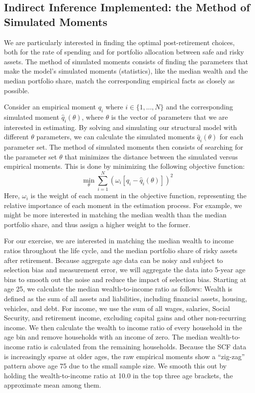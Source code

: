 \documentclass{article}
\begin{document}
\subsection{Indirect Inference Implemented: the Method of Simulated Moments}

We are particularly interested in finding the optimal post-retirement choices, both for the rate of spending and for portfolio allocation between safe and risky assets.
The method of simulated moments consists of finding the parameters that make the model's simulated moments (statistics), like the median wealth and the median portfolio share, match the corresponding empirical facts as closely as possible.

Consider an empirical moment $q_i$ where $i \in \{1,...,N\}$ and the corresponding simulated moment $\hat{q}_i(\theta)$, where $\theta$ is the vector of parameters that we are interested in estimating.
By solving and simulating our structural model with different $\theta$ parameters, we can calculate the simulated moments $\hat{q}_i(\theta)$ for each parameter set.
The method of simulated moments then consists of searching for the parameter set $\theta$ that minimizes the distance between the simulated versus empirical moments.
This is done by minimizing the following objective function:
\begin{equation}
\min_{\theta} \sum_{i=1}^{N}  \left( \omega_i [q_i - \hat{q}_i(\theta) ] \right)^2
\end{equation}
Here, $\omega_i$ is the weight of each moment in the objective function, representing the relative importance of each moment in the estimation process.
For example, we might be more interested in matching the median wealth than the median portfolio share, and thus assign a higher weight to the former.

For our exercise, we are interested in matching the median wealth to income ratios throughout the life cycle, and the median portfolio share of risky assets after retirement.
Because aggregate age data can be noisy and subject to selection bias and measurement error, we will aggregate the data into 5-year age bins to smooth out the noise and reduce the impact of selection bias.
Starting at age 25, we calculate the median wealth-to-income ratio as follows: Wealth is defined as the sum of all assets and liabilities, including financial assets, housing, vehicles, and debt.
For income, we use the sum of all wages, salaries, Social Security, and retirement income, excluding capital gains and other non-recurring income.
We then calculate the wealth to income ratio of every household in the age bin and remove households with an income of zero.
The median wealth-to-income ratio is calculated from the remaining households.
Because the SCF data is increasingly sparse at older ages, the raw empirical moments show a ``zig-zag'' pattern above age 75 due to the small sample size.
We smooth this out by holding the wealth-to-income ratio at 10.0 in the top three age brackets, the approximate mean among them.
\end{document}

